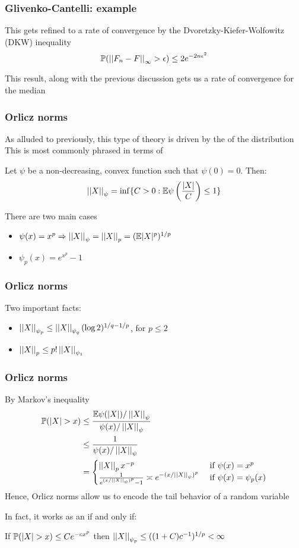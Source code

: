 \documentclass[12pt]{beamer}
\begin{document}
\begin{frame}[fragile]
\frametitle{Glivenko-Cantelli: example}
This gets refined to a rate of convergence by the Dvoretzky-Kiefer-Wolfowitz (DKW) inequality 
\[
\P( \norm{F_n - F}_{\infty} > \epsilon) \leq 2e^{-2n\epsilon^2}
\]

\vsp
This result, along with the previous discussion gets us a rate of convergence for the median
\end{frame}

\begin{frame}[fragile]
\frametitle{Orlicz norms}
As alluded to previously, this type of theory is driven by the  of the distribution
This is most commonly phrased in terms of 

\vsp
Let $\psi$ be a non-decreasing, convex function such that $\psi(0) = 0$. Then:
\[
\norm{X}_\psi = \inf\{ C > 0: \E \psi\left(  \frac{|X|}{C}\right) \leq 1\}
\]

\vsp
There are two main cases
\begin{itemize}
\item {} $\psi(x) = x^p \Rightarrow \norm{X}_\psi = \norm{X}_p = (\E |X|^p)^{1/p}$
\item {} $\psi_p(x)  = e^{x^p} - 1$ 
\end{itemize}
\end{frame}

\begin{frame}[fragile]
\frametitle{Orlicz norms}
Two important facts:
\begin{itemize}
\item $\norm{X}_{\psi_p} \leq \norm{X}_{\psi_q}(\log 2)^{1/q - 1/p}$, for $p \leq 2$
\item $\norm{X}_{p} \leq p!\norm{X}_{\psi_1}$
\end{itemize}
\end{frame}

\begin{frame}[fragile]
\frametitle{Orlicz norms}
By Markov's inequality
\begin{align*}
\P(|X| > x) & \leq \frac{\E \psi(|X|)/\norm{X}_{\psi}}{\psi(x)/\norm{X}_{\psi}} \\
& \leq
\frac{1}{\psi(x)/\norm{X}_{\psi}} \\
& =
\begin{cases}
\norm{X}_px^{-p} & \textrm{ if } \psi(x) = x^p \\
\frac{1}{e^{(x/\norm{X}_{\psi})^p}-1}  \asymp e^{-(x/\norm{X}_{\psi})^{p}}&  \textrm{ if } \psi(x) = \psi_p(x)
\end{cases}
\end{align*}
Hence, Orlicz norms allow us to encode the tail behavior of a random variable

\vsp
In fact, it works as an if and only if:

\vsp
If $\P(|X| > x) \leq C e^{-cx^p}$ then $\norm{X}_{\psi_p} \leq ( (1 + C)c^{-1})^{1/p} < \infty$
\end{frame}
\end{document}
